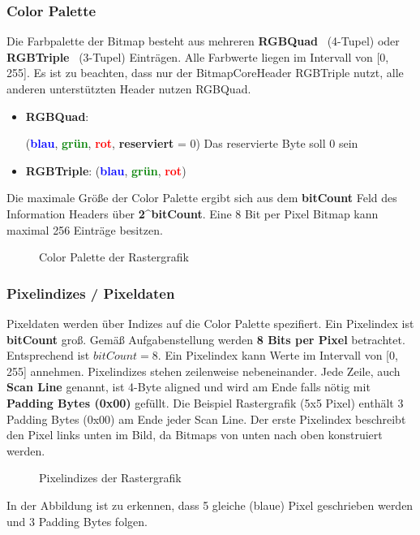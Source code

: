 \documentclass[course=erap]{aspdoc}
\newcommand{\hexdump}[2]{
 \begin{figure}[H]
   \small
   
   \vspace*{-5mm}
   \caption{#2}
 \end{figure}
}
\begin{document}
\subsubsection{Color Palette}
Die Farbpalette der Bitmap besteht aus mehreren \textbf{RGBQuad}~\cite{rgbQuad} (4-Tupel) oder \textbf{RGBTriple}~\cite{rgbTriple} (3-Tupel) Einträgen. Alle Farbwerte liegen im Intervall von [0, 255]. Es ist zu beachten, dass nur der BitmapCoreHeader RGBTriple nutzt, alle anderen unterstützten Header nutzen RGBQuad.
\newline
\begin{itemize}
  \item \textbf{RGBQuad}:
  
  (\textbf{\textcolor{blue}{blau}}, \textbf{\textcolor{green}{grün}}, \textbf{\textcolor{red}{rot}}, \textbf{reserviert} = 0) \newline
  Das reservierte Byte soll 0 sein
  \item \textbf{RGBTriple}: (\textbf{\textcolor{blue}{blau}}, \textbf{\textcolor{green}{grün}}, \textbf{\textcolor{red}{rot}})
  
\end{itemize}
Die maximale Größe der Color Palette ergibt sich aus dem \textbf{bitCount} Feld des Information Headers über \textbf{2\textasciicircum bitCount}. Eine 8 Bit per Pixel Bitmap kann maximal 256 Einträge besitzen.

\hexdump{res/example_28_5x5_colorpalette.txt}{Color Palette der Rastergrafik}

\subsubsection{Pixelindizes / Pixeldaten}
Pixeldaten werden über Indizes auf die Color Palette spezifiert.
Ein Pixelindex ist \textbf{bitCount} groß. Gemäß Aufgabenstellung werden \textbf{8 Bits per Pixel} betrachtet. Entsprechend ist $ bitCount = 8 $. Ein Pixelindex kann Werte im Intervall von [0, 255] annehmen.
Pixelindizes stehen zeilenweise nebeneinander. Jede Zeile, auch \textbf{Scan Line} genannt, ist 4-Byte aligned und wird am Ende falls nötig mit \textbf{Padding Bytes (0x00)} gefüllt. Die Beispiel Rastergrafik (5x5 Pixel) enthält 3 Padding Bytes (0x00) am Ende jeder Scan Line. Der erste Pixelindex beschreibt den Pixel links unten im Bild, da Bitmaps von unten nach oben konstruiert werden.~\cite{medium}

\hexdump{res/example_28_5x5_pixeldata.txt}{Pixelindizes der Rastergrafik}
In der Abbildung ist zu erkennen, dass 5 gleiche (blaue) Pixel geschrieben werden und 3 Padding Bytes folgen.
\end{document}
